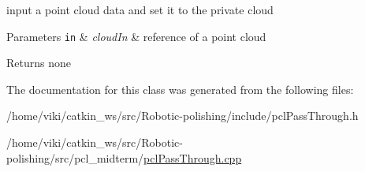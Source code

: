 input a point cloud data and set it to the private cloud 


\begin{DoxyParams}[1]{Parameters}
\mbox{\tt in}  & {\em cloud\+In} & reference of a point cloud \\
\hline
\end{DoxyParams}
\begin{DoxyReturn}{Returns}
none 
\end{DoxyReturn}


The documentation for this class was generated from the following files\+:\begin{DoxyCompactItemize}
\item 
/home/viki/catkin\+\_\+ws/src/\+Robotic-\/polishing/include/pcl\+Pass\+Through.\+h\item 
/home/viki/catkin\+\_\+ws/src/\+Robotic-\/polishing/src/pcl\+\_\+midterm/\hyperlink{pclPassThrough_8cpp}{pcl\+Pass\+Through.\+cpp}\end{DoxyCompactItemize}
